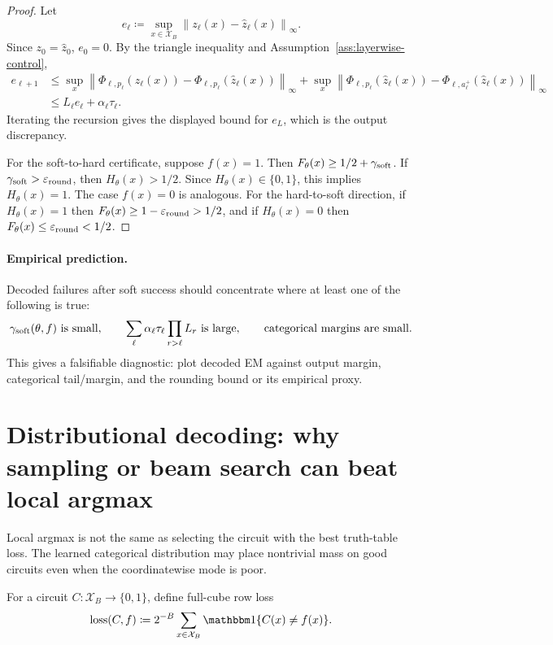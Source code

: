 \documentclass[11pt]{article}
\theoremstyle{definition}
\theoremstyle{remark}
\newcommand{\X}{\mathcal X}
\newcommand{\one}{\mathbbm 1}
\newcommand{\loss}{\operatorname{loss}}
\newcommand{\errround}{\varepsilon_{\rm round}}
\newcommand{\gammsoft}{\gamma_{\rm soft}}
\newcommand{\bits}{\{0,1\}}
\newcommand{\norm}[1]{\left\lVert #1\right\rVert}
\begin{document}
\begin{proof}
Let
\[
    e_\ell\coloneqq \sup_{x\in\X_B}\norm{z_\ell(x)-\hat z_\ell(x)}_\infty.
\]
Since $z_0=\hat z_0$, $e_0=0$.  By the triangle inequality and Assumption~\ref{ass:layerwise-control},
\begin{align*}
 e_{\ell+1}
 &\le
 \sup_x\norm{\Phi_{\ell,p_\ell}(z_\ell(x))-\Phi_{\ell,p_\ell}(\hat z_\ell(x))}_\infty
 +
 \sup_x\norm{\Phi_{\ell,p_\ell}(\hat z_\ell(x))-\Phi_{\ell,a^+_\ell}(\hat z_\ell(x))}_\infty\\
 &\le L_\ell e_\ell + \alpha_\ell\tau_\ell.
\end{align*}
Iterating the recursion gives the displayed bound for $e_L$, which is the output discrepancy.

For the soft-to-hard certificate, suppose $f(x)=1$.  Then $F_\theta(x)\ge 1/2+\gammsoft$.  If $\gammsoft>\errround$, then $H_\theta(x)>1/2$.  Since $H_\theta(x)\in\bits$, this implies $H_\theta(x)=1$.  The case $f(x)=0$ is analogous.  For the hard-to-soft direction, if $H_\theta(x)=1$ then $F_\theta(x)\ge1-\errround>1/2$, and if $H_\theta(x)=0$ then $F_\theta(x)\le\errround<1/2$.
\end{proof}

\paragraph{Empirical prediction.}
Decoded failures after soft success should concentrate where at least one of the following is true:
\[
    \gammsoft(\theta,f)\text{ is small},
    \qquad
    \sum_\ell \alpha_\ell\tau_\ell\prod_{r>\ell}L_r\text{ is large},
    \qquad
    \text{categorical margins are small.}
\]
This gives a falsifiable diagnostic: plot decoded EM against output margin, categorical tail/margin, and the rounding bound or its empirical proxy.

\section{Distributional decoding: why sampling or beam search can beat local argmax}

Local argmax is not the same as selecting the circuit with the best truth-table loss.  The learned categorical distribution may place nontrivial mass on good circuits even when the coordinatewise mode is poor.

For a circuit $C:\X_B\to\bits$, define full-cube row loss
\[
    \loss(C,f)
    \coloneqq
    2^{-B}\sum_{x\in\X_B}\one\{C(x)\ne f(x)\}.
\]
\end{document}

